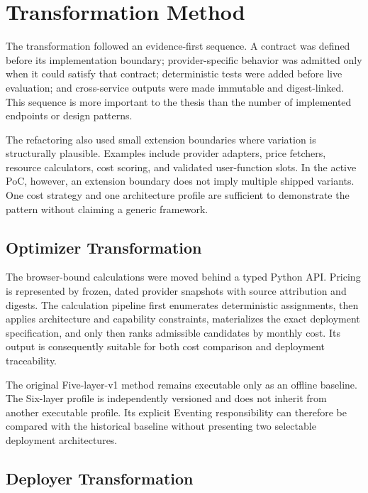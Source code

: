 \section{Transformation Method}
\label{sec:refactoring-methodology}

The transformation followed an evidence-first sequence. A contract was defined
before its implementation boundary; provider-specific behavior was admitted
only when it could satisfy that contract; deterministic tests were added before
live evaluation; and cross-service outputs were made immutable and
digest-linked. This sequence is more important to the thesis than the number of
implemented endpoints or design patterns.

The refactoring also used small extension boundaries where variation is
structurally plausible. Examples include provider adapters, price fetchers,
resource calculators, cost scoring, and validated user-function slots. In the
active PoC, however, an extension boundary does not imply multiple shipped
variants. One cost strategy and one architecture profile are sufficient to
demonstrate the pattern without claiming a generic framework.

\subsection{Optimizer Transformation}
\label{sec:refactoring-optimizer}

The browser-bound calculations were moved behind a typed Python API. Pricing is
represented by frozen, dated provider snapshots with source attribution and
digests. The calculation pipeline first enumerates deterministic assignments,
then applies architecture and capability constraints, materializes the exact
deployment specification, and only then ranks admissible candidates by monthly
cost. Its output is consequently suitable for both cost comparison and
deployment traceability.

The original Five-layer-v1 method remains executable only as an offline
baseline. The Six-layer profile is independently versioned and does not inherit
from another executable profile. Its explicit Eventing responsibility can
therefore be compared with the historical baseline without presenting two
selectable deployment architectures.

\subsection{Deployer Transformation}
\label{sec:refactoring-deployer}

